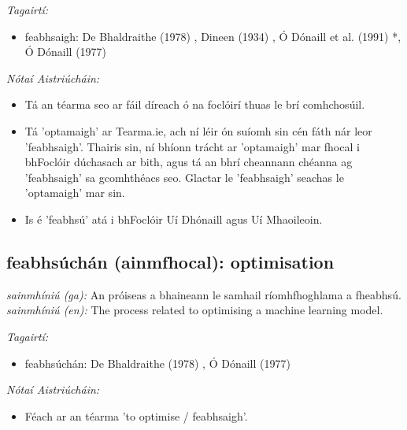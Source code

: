 \documentclass{article}
\begin{document}
 \noindent \textit{Tagairtí:}
\begin{itemize}
	\item feabhsaigh: De Bhaldraithe (1978) \cite{de-bhaldraithe}, Dineen (1934) \cite{dineen}, Ó Dónaill et al. (1991) \cite{focloir-beag}*, Ó Dónaill (1977) \cite{odonaill}
\end{itemize}

 \noindent \textit{Nótaí Aistriúcháin:}
\begin{itemize}
	\item Tá an téarma seo ar fáil díreach ó na foclóirí thuas le brí comhchosúil.
	\item Tá 'optamaigh' ar Tearma.ie, ach ní léir ón suíomh sin cén fáth nár leor 'feabhsaigh'. Thairis sin, ní bhíonn trácht ar 'optamaigh' mar fhocal i bhFoclóir dúchasach ar bith, agus tá an bhrí cheannann chéanna ag 'feabhsaigh' sa gcomhthéacs seo. Glactar le 'feabhsaigh' seachas le 'optamaigh' mar sin.
	\item Is é 'feabhsú' atá i bhFoclóir Uí Dhónaill agus Uí Mhaoileoin.
\end{itemize}


\subsection*{feabhsúchán (ainmfhocal): optimisation} 
 \noindent \textit{sainmhíniú (ga):} An próiseas a bhaineann le samhail ríomhfhoghlama a fheabhsú.
\newline\newline
 \noindent \textit{sainmhíniú (en):} The process related to optimising a machine learning model.
\newline

 \noindent \textit{Tagairtí:}
\begin{itemize}
	\item feabhsúchán: De Bhaldraithe (1978) \cite{de-bhaldraithe}, Ó Dónaill (1977) \cite{odonaill}
\end{itemize}

 \noindent \textit{Nótaí Aistriúcháin:}
\begin{itemize}
	\item Féach ar an téarma 'to optimise / feabhsaigh'.
\end{itemize}
\end{document}
